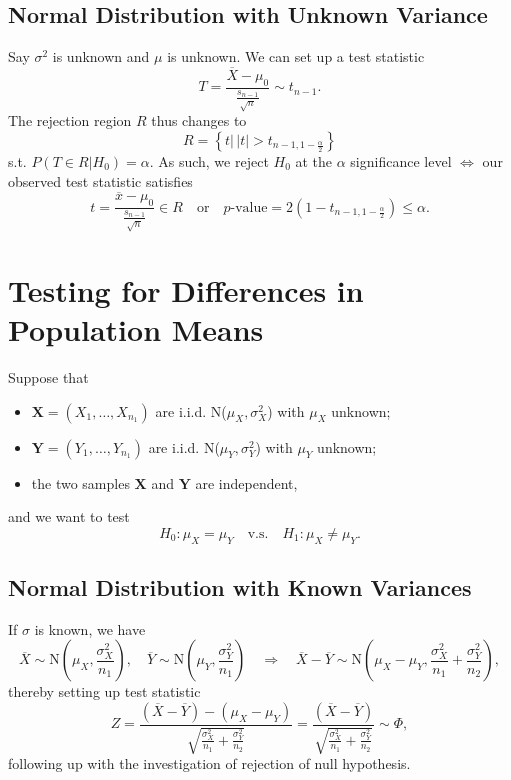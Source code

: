 \documentclass[12pt]{report}
\theoremstyle{definition}
\begin{document}
\subsection{Normal Distribution with Unknown Variance}

Say $\sigma^{2}$ is unknown and $\mu$ is unknown.
We can set up a test statistic
\[
    T=\frac{\overline{X}-\mu_0}{\frac{s_{n-1}}{\sqrt{n}}}\sim t_{n-1}.
\]
The rejection region $R$ thus changes to
\[
    R=\left\{t\big|\,|t|>t_{n-1,1-\frac{\alpha}{2}}\right\}
\]
s.t. $P(T\in R|H_0)=\alpha$.
As such, we reject $H_0$ at the $\alpha$ significance level $\iff$ our observed
test statistic satisfies
\[
    t=\frac{\overline{x}-\mu_0}{\frac{s_{n-1}}{\sqrt{n}}}\in R
    \quad\text{or}\quad
    p\text{-value}=2\left(1-t_{n-1, 1-\frac{\alpha}{2}}\right)\le\alpha.
\]

\section{Testing for Differences in Population Means}

Suppose that
\begin{itemize}
    \item $\mathbf{X}=(X_1,\ldots,X_{n_1})$ are i.i.d. N($\mu_X,\sigma_X^2$) with
        $\mu_X$ unknown;
    \item $\mathbf{Y}=(Y_1,\ldots,Y_{n_1})$ are i.i.d. N($\mu_Y,\sigma_Y^2$) with
        $\mu_Y$ unknown;
    \item the two samples $\mathbf{X}$ and $\mathbf{Y}$ are independent,
\end{itemize} 
and we want to test
\[
    H_0:\mu_X=\mu_Y\quad\text{v.s.}\quad
    H_1:\mu_X\neq\mu_Y.
\]

\subsection{Normal Distribution with Known Variances}

If $\sigma$ is known, we have
\[
    \overline{X}\sim\text{N}\left(\mu_X,\frac{\sigma_X^2}{n_1}\right),\quad
    \overline{Y}\sim\text{N}\left(\mu_Y,\frac{\sigma_Y^2}{n_1}\right)\quad
    \Longrightarrow\quad
    \overline{X}-\overline{Y}\sim\text{N}\left(\mu_X-\mu_Y,
    \frac{\sigma_X^2}{n_1}+\frac{\sigma_Y^2}{n_2}\right),
\]
thereby setting up test statistic
\[
    Z=\frac{(\overline{X}-\overline{Y})-(\mu_X-\mu_Y)}
    {\sqrt{\frac{\sigma_X^2}{n_1}+\frac{\sigma_Y^2}{n_2}}}
    =\frac{(\overline{X}-\overline{Y})}
    {\sqrt{\frac{\sigma_X^2}{n_1}+\frac{\sigma_Y^2}{n_2}}}
    \sim\Phi,
\]
following up with the investigation of rejection of null hypothesis.
\end{document}
